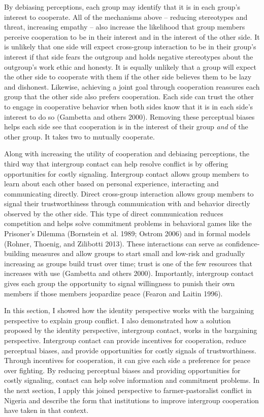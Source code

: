 \documentclass[11pt]{article}
\begin{document}
By debiasing perceptions, each group may identify that it is in each
group's interest to cooperate. All of the mechanisms above -- reducing
stereotypes and threat, increasing empathy -- also increase the
likelihood that group members perceive cooperation to be in their
interest and in the interest of the other side. It is unlikely that one
side will expect cross-group interaction to be in their group's interest
if that side fears the outgroup and holds negative stereotypes about the
outgroup's work ethic and honesty. It is equally unlikely that a group
will expect the other side to cooperate with them if the other side
believes them to be lazy and dishonest. Likewise, achieving a joint goal
through cooperation reassures each group that the other side also
prefers cooperation. Each side can trust the other to engage in
cooperative behavior when both sides know that it is in each side's
interest to do so (Gambetta and others 2000). Removing these perceptual
biases helps each side see that cooperation is in the interest of their
group \emph{and} of the other group. It takes two to mutually cooperate.

Along with increasing the utility of cooperation and debiasing
perceptions, the third way that intergroup contact can help resolve
conflict is by offering opportunities for costly signaling. Intergroup
contact allows group members to learn about each other based on personal
experience, interacting and communicating directly. Direct cross-group
interaction allows group members to signal their trustworthiness through
communication with and behavior directly observed by the other side.
This type of direct communication reduces competition and helps solve
commitment problems in behavioral games like the Prisoner's Dilemma
(Bornstein et al. 1989; Ostrom 2006) and in formal models (Rohner,
Thoenig, and Zilibotti 2013). These interactions can serve as
confidence-building measures and allow groups to start small and
low-risk and gradually increasing as groups build trust over time; trust
is one of the few resources that increases with use (Gambetta and others
2000). Importantly, intergroup contact gives each group the opportunity
to signal willingness to punish their own members if those members
jeopardize peace (Fearon and Laitin 1996).

In this section, I showed how the identity perspective works with the
bargaining perspective to explain group conflict. I also demonstrated
how a solution proposed by the identity perspective, intergroup contact,
works in the bargaining perspective. Intergroup contact can provide
incentives for cooperation, reduce perceptual biases, and provide
opportunities for costly signals of trustworthiness. Through incentives
for cooperation, it can give each side a preference for peace over
fighting. By reducing perceptual biases and providing opportunities for
costly signaling, contact can help solve information and commitment
problems. In the next section, I apply this joined perspective to
farmer-pastoralist conflict in Nigeria and describe the form that
institutions to improve intergroup cooperation have taken in that
context.
\end{document}
